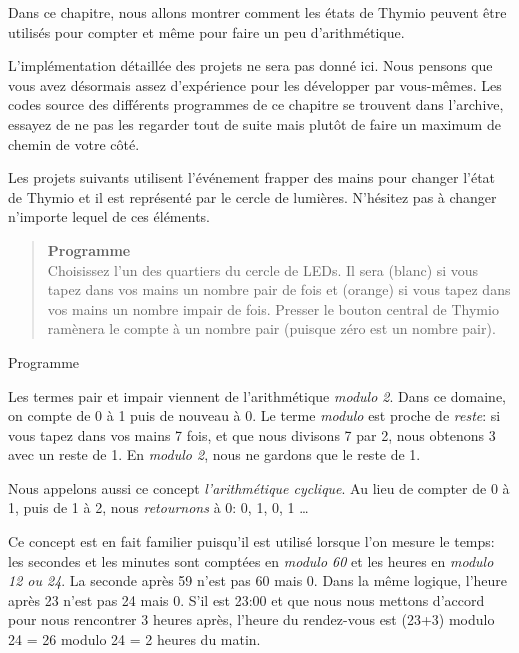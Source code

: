 \label{ch.counting}

Dans ce chapitre, nous allons montrer comment les états de Thymio peuvent être utilisés pour compter et même pour faire un peu d'arithmétique. 

L'implémentation détaillée des projets ne sera pas donné ici. Nous pensons que vous avez désormais assez d'expérience pour les développer par vous-mêmes. Les codes source des différents programmes de ce chapitre se trouvent dans l'archive, essayez de ne pas les regarder tout de suite mais plutôt de faire un maximum de chemin de votre côté.

Les projets suivants utilisent l'événement frapper des mains  pour changer l'état de Thymio et il est représenté par le cercle de lumières.
N'hésitez pas à changer n'importe lequel de ces éléments.



\begin{quote}
\textbf{Programme}\\Choisissez l'un des quartiers du cercle de LEDs.
Il sera  (blanc) si vous tapez dans vos mains un nombre pair de fois et  (orange) si vous tapez dans vos mains un nombre impair de fois.
Presser le bouton central de Thymio ramènera le compte à un nombre pair (puisque zéro est un nombre pair).
\end{quote}

{\raggedleft \hfill Programme }

Les termes pair et impair viennent de l'arithmétique \emph{modulo 2}.
Dans ce domaine, on compte de 0 à 1 puis de nouveau à 0.
Le terme \emph{modulo} est proche de \emph{reste}:
si vous tapez dans vos mains 7 fois,
et que nous divisons 7 par 2,
nous obtenons 3 avec un reste de 1.
En \emph{modulo 2}, nous ne gardons que le reste de 1.

Nous appelons aussi ce concept \emph{l'arithmétique cyclique}. Au lieu de compter de 0 à 1, puis de 1 à 2, nous \emph{retournons} à 0: 0, 1, 0, 1 \ldots

Ce concept est en fait familier puisqu'il est utilisé
lorsque l'on mesure le temps:
les secondes et les minutes sont comptées en \emph{modulo 60}
et les heures en \emph{modulo 12 ou 24}.
La seconde après 59 n'est pas 60 mais 0.
Dans la même logique, l'heure après 23 n'est pas 24 mais 0.
S'il est 23:00 et que nous nous mettons d'accord pour nous rencontrer 3 heures après, l'heure du rendez-vous est (23+3) modulo 24 = 26 modulo 24 = 2 heures du matin.

